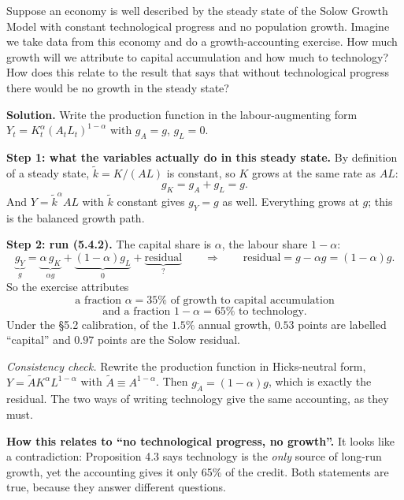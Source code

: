 \documentclass[12pt, letterpaper]{article}
\begin{document}
\begin{tcolorbox}[oddbox,title={Problem 5.3 \quad Causes of Growth and Growth Accounting}]
\begin{tcolorbox}[questionbox]
Suppose an economy is well described by the steady state of the Solow Growth Model with
constant technological progress and no population growth. Imagine we take data from this
economy and do a growth-accounting exercise. How much growth will we attribute to capital
accumulation and how much to technology? How does this relate to the result that says that
without technological progress there would be no growth in the steady state?
\end{tcolorbox}

\textbf{Solution.} Write the production function in the labour-augmenting form
$Y_t=K_t^{\alpha}(A_tL_t)^{1-\alpha}$ with $g_A=g$, $g_L=0$.

\smallskip
\textbf{Step 1: what the variables actually do in this steady state.} By definition of a
steady state, $\tilde k=K/(AL)$ is constant, so $K$ grows at the same rate as $AL$:
\[
g_K=g_A+g_L=g .
\]
And $Y=\tilde k^{\alpha}AL$ with $\tilde k$ constant gives $g_Y=g$ as well. Everything grows
at $g$; this is the balanced growth path.

\smallskip
\textbf{Step 2: run (5.4.2).} The capital share is $\alpha$, the labour share $1-\alpha$:
\[
\underbrace{g_Y}_{g}
=\underbrace{\alpha\,g_K}_{\alpha g}
+\underbrace{(1-\alpha)g_L}_{0}
+\underbrace{\text{residual}}_{?}
\qquad\Longrightarrow\qquad
\text{residual}=g-\alpha g=(1-\alpha)g .
\]
So the exercise attributes
\[
\boxed{\text{a fraction }\alpha=35\%\text{ of growth to capital accumulation}}
\]
\[
\boxed{\text{and a fraction }1-\alpha=65\%\text{ to technology.}}
\]
Under the \S5.2 calibration, of the $1.5\%$ annual growth, $0.53$ points are labelled
``capital'' and $0.97$ points are the Solow residual. \checkmark

\smallskip
\emph{Consistency check.} Rewrite the production function in Hicks-neutral form,
$Y=\tilde A K^{\alpha}L^{1-\alpha}$ with $\tilde A\equiv A^{1-\alpha}$. Then
$g_{\tilde A}=(1-\alpha)g$, which is exactly the residual. The two ways of writing
technology give the same accounting, as they must. \checkmark

\smallskip
\textbf{How this relates to ``no technological progress, no growth''.} It looks like a
contradiction: Proposition 4.3 says technology is the \emph{only} source of long-run growth,
yet the accounting gives it only 65\% of the credit. Both statements are true, because they
answer different questions.


\end{tcolorbox}
\end{document}
